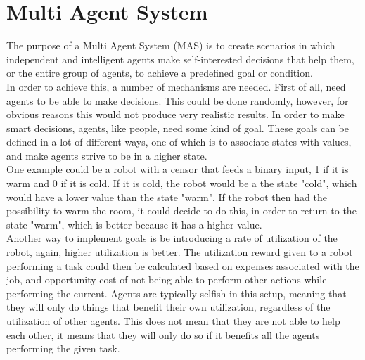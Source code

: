 \chapter{Multi Agent System}
The purpose of a Multi Agent System (MAS) is to create scenarios in which independent and intelligent agents make self-interested decisions that help them, or the entire group of agents, to achieve a predefined goal or condition.\\


\indent In order to achieve this, a number of mechanisms are needed. First of all, need agents to be able to make decisions. This could be done randomly, however, for obvious reasons this would not produce very realistic results. In order to make smart decisions, agents, like people, need some kind of goal. These goals can be defined in a lot of different ways, one of which is to associate states with values, and make agents strive to be in a higher state. \\ %
\indent One example could be a robot with a censor that feeds a binary input, 1 if it is warm and 0 if it is cold. If it is cold, the robot would be a the state "cold", which would have a lower value than the state "warm". If the robot then had the possibility to warm the room, it could decide to do this, in order to return to the state "warm", which is better because it has a higher value.\\


\indent Another way to implement goals is be introducing a rate of utilization of the robot, again, higher utilization is better. The utilization reward given to a robot performing a task could then be calculated based on expenses associated with the job, and opportunity cost of not being able to perform other actions while performing the current. Agents are typically selfish in this setup, meaning that they will only do things that benefit their own utilization, regardless of the utilization of other agents. This does not mean that they are not able to help each other, it means that they will only do so if it benefits all the agents performing the given task.